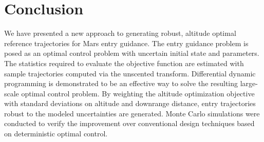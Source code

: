 \documentclass[journal ]{new-aiaa}
\begin{document}



\section*{Conclusion}
We have presented a new approach to generating robust, altitude optimal reference trajectories for Mars entry guidance. The entry guidance problem is posed as an optimal control problem with uncertain initial state and parameters. The statistics required to evaluate the objective function are estimated with sample trajectories computed via the unscented transform. Differential dynamic programming is demonstrated to be an effective way to solve the resulting large-scale optimal control problem. By weighting the altitude optimization objective with standard deviations on altitude and downrange distance, entry trajectories robust to the modeled uncertainties are generated. Monte Carlo simulations were conducted to verify the improvement over conventional design techniques based on deterministic optimal control. 
%

\end{document}
